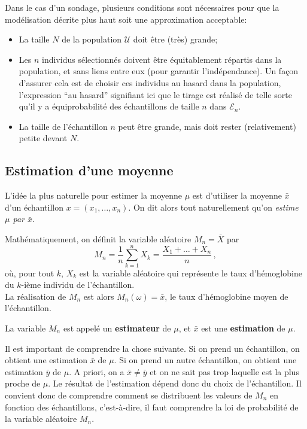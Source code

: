 \documentclass[12pt, a4paper]{book}
\numberwithin{equation}{section}
\begin{document}
Dans le cas d'un sondage, plusieurs conditions sont nécessaires pour que la modélisation décrite plus haut soit une approximation acceptable:
\begin{itemize}
  \item La taille $N$ de la population $\mathcal{U}$ doit être (très) grande;
	\item Les $n$ individus sélectionnés doivent être équitablement répartis dans la population, et sans liens entre eux (pour garantir l'indépendance). Un façon d'assurer cela est de choisir ces individus au hasard dans la population, l'expression ``au hasard'' signifiant ici que le tirage
est réalisé de telle sorte qu'il y a équiprobabilité des échantillons de taille $n$ dans $\mathcal{E}_n$.
	\item La taille de l'échantillon $n$ peut être grande, mais doit rester (relativement) petite devant $N$.
\end{itemize}

\subsection{Estimation d'une moyenne}

L'idée la plus naturelle pour estimer la moyenne $\mu$ est 
d'utiliser la moyenne $\bar{x}$ d'un échantillon $x=(x_1,\hdots, x_n)$. 
On dit alors tout naturellement qu'on \emph{estime $\mu$ par $\bar{x}$}.

Mathématiquement, %
on définit la variable aléatoire $M_n = \overline{X}$ 
par
\[ M_n = \frac{1}{n} \sum_{k=1}^n X_k = \frac{X_1 + \hdots + X_n}{n}\,, \]
où, pour tout $k$, $X_k$ est la variable aléatoire qui représente le taux d'hémoglobine du $k$-ième
individu de l'échantillon. %
\\
La réalisation de $M_n$ est alors $M_n(\omega) = \bar{x}$, le taux d'hémoglobine moyen de l'échantillon.

La variable $M_n$ est appelé un {\bf estimateur} de $\mu$, et $\bar{x}$ est une {\bf estimation} de $\mu$.

Il est important de comprendre la chose suivante. Si on prend un échantillon, on obtient une estimation
$\bar{x}$ de $\mu$. Si on prend un autre échantillon, on obtient une estimation $\bar{y}$ de $\mu$.
A priori, on a $\bar{x}\neq\bar{y}$ et on ne sait pas trop laquelle est la plus proche de $\mu$.
Le résultat de l'estimation dépend donc du choix de l'échantillon. Il convient donc de comprendre
comment se distribuent les valeurs de $M_n$ en fonction des échantillons, c'est-à-dire, il faut comprendre
la loi de probabilité de la variable aléatoire $M_n$.
\end{document}
